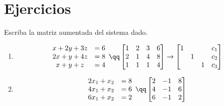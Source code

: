 \section{Ejercicios}
Escriba la matriz aumentada del sistema dado. 
\begin{enumerate}
    \item \begin{center}
       \begin{align*}
           \begin{array}{cc}
                x+2y+3z&=6 \\ 
                2x+y+4z&=8 \\ 
                x+y+z&=4 \\ 
           \end{array} 
           \qq 
           \begin{bmatrix}
                1 & 2 & 3 & 6 \\ 
                2 & 1 & 4 & 8 \\ 
                1 & 1 & 1 & 4 \\ 
           \end{bmatrix}
           \to 
           \begin{bmatrix}
               1&&&c_1 \\ 
               &1&&c_2 \\ 
               &&1&c_3 \\ 
           \end{bmatrix}
       \end{align*}
    \end{center}

    
    \item \begin{center}
       \begin{align*}
            \begin{array}{cc}
                2x_1+x_2&=8 \\ 
                4x_1+x_2&=6 \\ 
                6x_1+x_2&=2 \\ 
            \end{array}
            \qq \begin{bmatrix}
                2&-1&8 \\
                4&-1&6 \\
                6&-1&2 \\
            \end{bmatrix}
       \end{align*}
    \end{center}
\end{enumerate}
